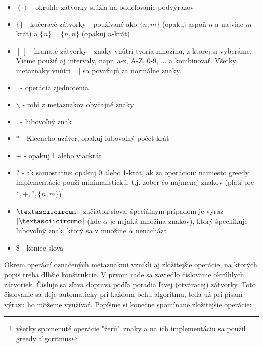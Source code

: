 \begin{itemize}
\item $()$ - okrúhle zátvorky slúžia na oddeľovanie podvýrazov
\item $\lbrace \rbrace$ - kučeravé zátvorky - používané ako $\{n,m\}$ (opakuj aspoň $n$ a najviac $m$-krát) a $\{n\}=\{n,n\}$ (opakuj $n$-krát)
\item $[~]$ - hranaté zátvorky - znaky vnútri tvoria množinu, z ktorej si vyberáme. Vieme použiť aj intervaly, napr. a-z, A-Z, 0-9, ... a kombinovať. Všetky metaznaky vnútri [~] sa považujú za normálne znaky.
\item | - operácia zjednotenia
\item $\backslash$ - robí z metaznakov obyčajné znaky
\item . - ľubovoľný znak
\item $*$ - Kleeneho uzáver, opakuj ľubovoľný počet krát
\item $+$ - opakuj 1 alebo viackrát
\item ? - ak samostatne: opakuj 0 alebo 1-krát, ak za operáciou: namiesto greedy implementácie použi minimalistickú, t.j. zober čo najmenej znakov (platí pre $*,+,?,\lbrace n,m \rbrace$)\footnote{všetky spomenuté operácie "žerú"~znaky a na ich implementáciu sa použil greedy algoritmus}
\item $\textasciicircum$ - začiatok slova; špeciálnym prípadom je výraz $[\textasciicircum\alpha]$ (kde $\alpha$ je nejaká množina znakov), ktorý špecifikuje ľubovoľný znak, ktorý sa v množine $\alpha$ nenacháza
\item \$ - koniec slova
\end{itemize}

Okrem operácií označených metaznakmi vznikli aj zložitejšie operácie, na ktorých popis treba dlhšie konštrukcie. V prvom rade sa zaviedlo číslovanie okrúhlych zátvoriek. Čísluje sa zľava doprava podľa poradia ľavej (otváracej) zátvorky. Toto číslovanie sa deje automaticky pri každom behu algoritmu, teda už pri písaní výrazu ho môžeme využívať. Popíšme si konečne spomínané zložitejšie operácie:


